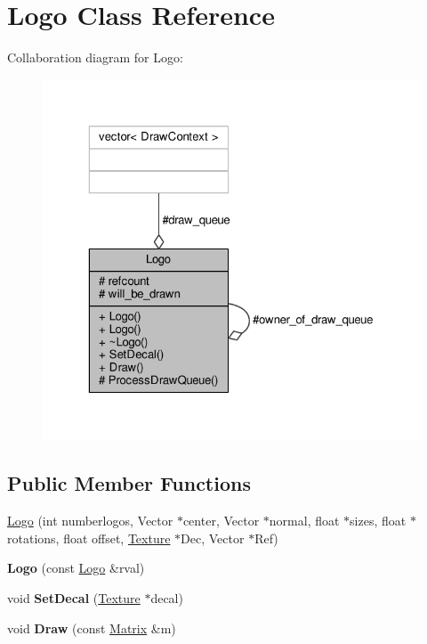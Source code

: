 \hypertarget{classLogo}{}\section{Logo Class Reference}
\label{classLogo}


Collaboration diagram for Logo\+:
\nopagebreak
\begin{figure}[H]
\begin{center}
\leavevmode
\includegraphics[width=323pt]{dd/df4/classLogo__coll__graph}
\end{center}
\end{figure}
\subsection*{Public Member Functions}
\begin{DoxyCompactItemize}
\item 
\hyperlink{classLogo_a56d89c35e1c64ffdbc82cbd50356555c}{Logo} (int numberlogos, Vector $\ast$center, Vector $\ast$normal, float $\ast$sizes, float $\ast$rotations, float offset, \hyperlink{classTexture}{Texture} $\ast$Dec, Vector $\ast$Ref)
\item 
{\bfseries Logo} (const \hyperlink{classLogo}{Logo} \&rval)\hypertarget{classLogo_a41f21e144b0850f95f2c4fb2f1bd0ddd}{}\label{classLogo_a41f21e144b0850f95f2c4fb2f1bd0ddd}

\item 
void {\bfseries Set\+Decal} (\hyperlink{classTexture}{Texture} $\ast$decal)\hypertarget{classLogo_aad8a005bcc9903d606407be64407a88a}{}\label{classLogo_aad8a005bcc9903d606407be64407a88a}

\item 
void {\bfseries Draw} (const \hyperlink{classMatrix}{Matrix} \&m)\hypertarget{classLogo_aabb164940f5438ca2308dedb77969579}{}\label{classLogo_aabb164940f5438ca2308dedb77969579}

\end{DoxyCompactItemize}
